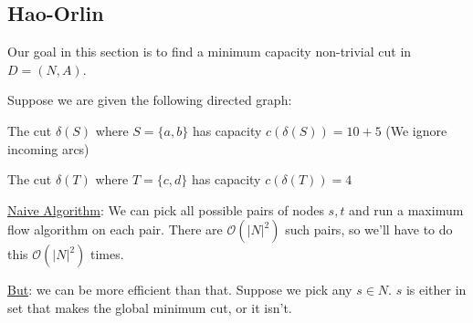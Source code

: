 \subsection{Hao-Orlin}
Our goal in this section is to find a minimum capacity non-trivial cut in $D = (N, A)$.

\begin{example}{}{}
    Suppose we are given the following directed graph:

    \begin{minipage}{\textwidth}
        \centering
    \end{minipage}

    The cut $\delta(S)$ where $S = \{a,b\}$ has capacity $c(\delta(S)) = 10 + 5$ (We ignore incoming arcs)

    The cut $\delta(T)$ where $T = \{c,d\}$ has capacity $c(\delta(T)) = 4$
\end{example}

\underline{Naive Algorithm}: We can pick all possible pairs of nodes $s,t$ and run a maximum flow algorithm on each pair. 
There are $\mathcal{O}(|N|^2)$ such pairs, so we'll have to do this $\mathcal{O}(|N|^2)$ times.

\underline{But}: we can be more efficient than that. Suppose we pick any $s \in N$. $s$ is either in set that makes the global minimum cut, or it isn't. 
